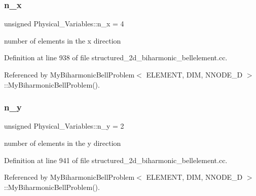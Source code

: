 \mbox{\label{namespacePhysical__Variables_ae766d6695cfb9a8d87be9767b38245ff}} 
\subsubsection{\texorpdfstring{n\+\_\+x}{n\_x}}
{\footnotesize\ttfamily unsigned Physical\+\_\+\+Variables\+::n\+\_\+x = 4}



number of elements in the x direction 



Definition at line 938 of file structured\+\_\+2d\+\_\+biharmonic\+\_\+bellelement.\+cc.



Referenced by My\+Biharmonic\+Bell\+Problem$<$ E\+L\+E\+M\+E\+N\+T, D\+I\+M, N\+N\+O\+D\+E\+\_\+D $>$\+::\+My\+Biharmonic\+Bell\+Problem().

\mbox{\label{namespacePhysical__Variables_a35801b250816fa72ce9023f8738515fa}} 
\subsubsection{\texorpdfstring{n\+\_\+y}{n\_y}}
{\footnotesize\ttfamily unsigned Physical\+\_\+\+Variables\+::n\+\_\+y = 2}



number of elements in the y direction 



Definition at line 941 of file structured\+\_\+2d\+\_\+biharmonic\+\_\+bellelement.\+cc.



Referenced by My\+Biharmonic\+Bell\+Problem$<$ E\+L\+E\+M\+E\+N\+T, D\+I\+M, N\+N\+O\+D\+E\+\_\+D $>$\+::\+My\+Biharmonic\+Bell\+Problem().

